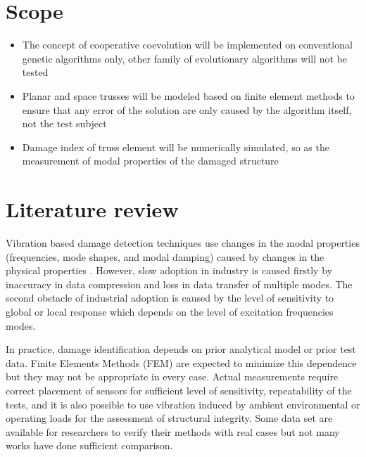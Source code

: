 \section{Scope}
\begin{itemize}[leftmargin=\dimexpr 14pt+0.63in]
\item The concept of cooperative coevolution will be implemented on conventional genetic algorithms only, other family of evolutionary algorithms will not be tested
\item Planar and space trusses will be modeled based on finite element methods to ensure that any error of the solution are only caused by the algorithm itself, not the test subject
\item Damage index of truss element will be numerically simulated, so as the measurement of modal properties of the damaged structure
\end{itemize}

\section{Literature review}


Vibration based damage detection techniques use changes in the modal properties (frequencies, mode shapes, and modal damping) caused by changes in the physical properties \cite{doebling1998}. However, slow adoption in industry is caused firstly by inaccuracy in data compression and loss in data transfer of multiple modes. The second obstacle of industrial adoption is caused by the level of sensitivity to global or local response which depends on the level of excitation frequencies modes.

In practice, damage identification depends on prior analytical model or prior test data. Finite Elements Methods (FEM) are expected to minimize this dependence but they may not be appropriate in every case. Actual measurements require correct placement of sensors for sufficient level of sensitivity, repeatability of the tests, and it is also possible to use vibration induced by ambient environmental \cite{koo2008} or operating loads for the assessment of structural integrity. Some data set are available for researchers to verify their methods with real cases but not many works have done sufficient comparison.

